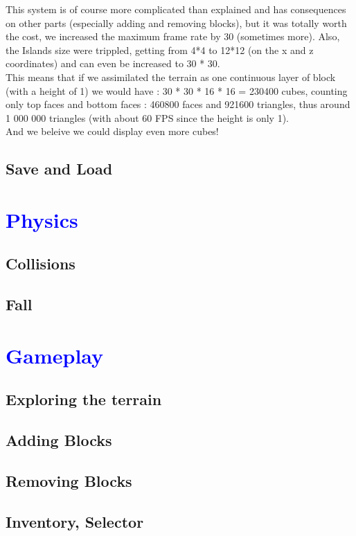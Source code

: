 \documentclass[article]{report}         %
\begin{document}
          This system is of course more complicated than explained and has consequences on other parts (especially adding and removing blocks), but it was totally worth the cost, we increased the maximum  frame rate by 30 (sometimes more). Also, the Islands size were trippled, getting from 4*4 to 12*12 (on the x and z coordinates) and can even be increased to 30 * 30.\\
          This means that if we assimilated the terrain as one continuous layer of block (with a height of 1) we would have : 30 * 30 * 16 * 16 = 230400 cubes, counting only top faces and bottom faces : 460800 faces and 921600 triangles, thus around 1 000 000 triangles (with about 60 FPS since the height is only 1).\\
          And we beleive we could display even more cubes!\\

      \section{Save and Load}
    \chapter{\textcolor{blue}{Physics}}
      \section{Collisions} %
      \section{Fall}
    \chapter{\textcolor{blue}{Gameplay}}
      \section{Exploring the terrain}
      \section{Adding Blocks}
      \section{Removing Blocks}
      \section{Inventory, Selector}
\end{document}
